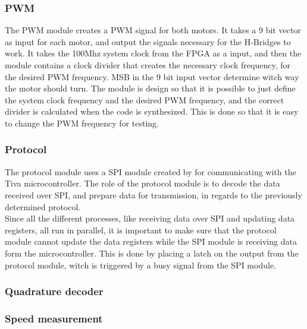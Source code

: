 \documentclass[../../../main]{subfiles}
\begin{document}
\subsubsection{PWM}
The PWM module creates a PWM signal for both motors. It takes a 9 bit vector as input for each motor, and output the signals necessary for the H-Bridges to work. 
It takes the 100Mhz system clock from the FPGA as a input, and then the module contains a clock divider that creates the necessary clock frequency, for the desired PWM frequency. 
MSB in the 9 bit input vector determine witch way the motor should turn. 
The module is design so that it is possible to just define the system clock frequency and the desired PWM frequency, and the correct divider is calculated when the code is synthesized.
This is done so that it is easy to change the PWM frequency for testing.
\subsubsection{Protocol}
The protocol module uses a SPI module created by  for communicating with the Tiva microcontroller.
The role of the protocol module is to decode the data received over SPI, and prepare data for transmission, in regards to the previously determined protocol.
\\
Since all the different processes, like receiving data over SPI and updating data registers, all run in parallel, it is important to make sure that the protocol module cannot update the data registers while the SPI module is receiving data form the microcontroller.
This is done by placing a latch on the output from the protocol module, witch is triggered by a busy signal from the SPI module. 

\subsubsection{Quadrature decoder}


\subsubsection{Speed measurement}
\end{document}
